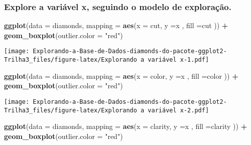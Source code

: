 \documentclass[
]{article}
\newenvironment{Shaded}{\begin{snugshade}}{\end{snugshade}}
\newcommand{\DataTypeTok}[1]{\textcolor[rgb]{0.13,0.29,0.53}{#1}}
\newcommand{\KeywordTok}[1]{\textcolor[rgb]{0.13,0.29,0.53}{\textbf{#1}}}
\newcommand{\NormalTok}[1]{#1}
\newcommand{\OperatorTok}[1]{\textcolor[rgb]{0.81,0.36,0.00}{\textbf{#1}}}
\newcommand{\StringTok}[1]{\textcolor[rgb]{0.31,0.60,0.02}{#1}}
\begin{document}
\hypertarget{explore-a-variuxe1vel-x-seguindo-o-modelo-de-explorauxe7uxe3o.}{%
\subsubsection{Explore a variável x, seguindo o modelo de
exploração.}\label{explore-a-variuxe1vel-x-seguindo-o-modelo-de-explorauxe7uxe3o.}}

\begin{Shaded}
\begin{Highlighting}[]
\KeywordTok{ggplot}\NormalTok{(}\DataTypeTok{data =}\NormalTok{ diamonds, }\DataTypeTok{mapping =} \KeywordTok{aes}\NormalTok{(}\DataTypeTok{x =}\NormalTok{ cut, }\DataTypeTok{y =}\NormalTok{x , }\DataTypeTok{fill =}\NormalTok{cut )) }\OperatorTok{+}\StringTok{ }\KeywordTok{geom_boxplot}\NormalTok{(}\DataTypeTok{outlier.color =} \StringTok{"red"}\NormalTok{)}
\end{Highlighting}
\end{Shaded}

\texttt{[image: Explorando-a-Base-de-Dados-diamonds-do-pacote-ggplot2-Trilha3\_files/figure-latex/Explorando a variável x-1.pdf]}

\begin{Shaded}
\begin{Highlighting}[]
\KeywordTok{ggplot}\NormalTok{(}\DataTypeTok{data =}\NormalTok{ diamonds, }\DataTypeTok{mapping =} \KeywordTok{aes}\NormalTok{(}\DataTypeTok{x =}\NormalTok{ color, }\DataTypeTok{y =}\NormalTok{x , }\DataTypeTok{fill =}\NormalTok{color )) }\OperatorTok{+}\StringTok{ }\KeywordTok{geom_boxplot}\NormalTok{(}\DataTypeTok{outlier.color =} \StringTok{"red"}\NormalTok{)}
\end{Highlighting}
\end{Shaded}

\texttt{[image: Explorando-a-Base-de-Dados-diamonds-do-pacote-ggplot2-Trilha3\_files/figure-latex/Explorando a variável x-2.pdf]}

\begin{Shaded}
\begin{Highlighting}[]
\KeywordTok{ggplot}\NormalTok{(}\DataTypeTok{data =}\NormalTok{ diamonds, }\DataTypeTok{mapping =} \KeywordTok{aes}\NormalTok{(}\DataTypeTok{x =}\NormalTok{ clarity, }\DataTypeTok{y =}\NormalTok{x , }\DataTypeTok{fill =}\NormalTok{clarity )) }\OperatorTok{+}\StringTok{ }\KeywordTok{geom_boxplot}\NormalTok{(}\DataTypeTok{outlier.color =} \StringTok{"red"}\NormalTok{)}
\end{Highlighting}
\end{Shaded}
\end{document}
